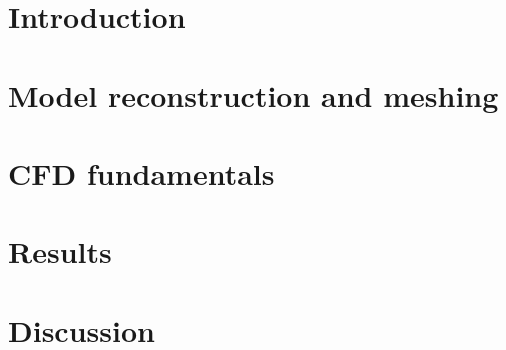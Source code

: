 \documentclass[12pt]{report}
\begin{document}
\chapter{Introduction}



%
%

\chapter{Model reconstruction and meshing} \label{MRM}



\chapter{CFD fundamentals} \label{cfd}



\chapter{Results}



\chapter{Discussion}



% 
% 
 

 

 
\end{document}
